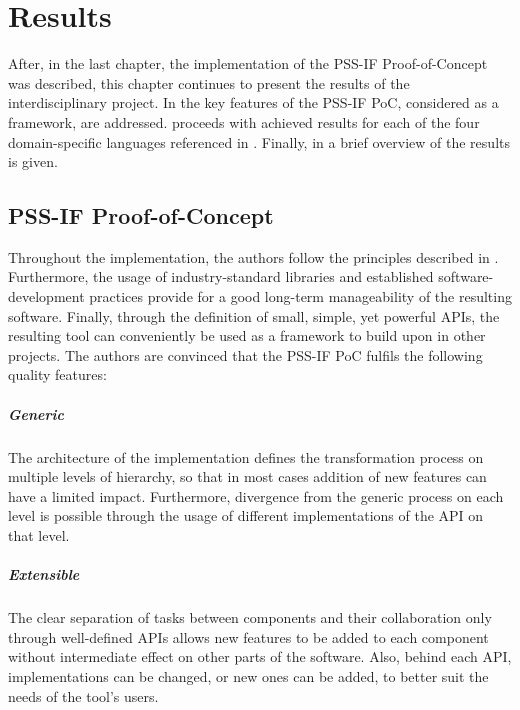 \chapter{Results}
\label{chap:results}

After, in the last chapter, the implementation of the PSS-IF Proof-of-Concept was described, this chapter continues to present the results of the interdisciplinary project. In  the key features of the PSS-IF PoC, considered as a framework, are addressed.  proceeds with achieved results for each of the four domain-specific languages referenced in . Finally, in  a brief overview of the results is given.

\section{PSS-IF Proof-of-Concept}
\label{sec:results:framework}

Throughout the implementation, the authors follow the principles described in . Furthermore, the usage of industry-standard libraries and established software-development practices provide for a good long-term manageability of the resulting software. Finally, through the definition of small, simple, yet powerful APIs, the resulting tool can conveniently be used as a framework to build upon in other projects. The authors are convinced that the PSS-IF PoC fulfils the following quality features:

\paragraph{Generic} The architecture of the implementation defines the transformation process on multiple levels of hierarchy, so that in most cases addition of new features can have a limited impact. Furthermore, divergence from the generic process on each level is possible through the usage of different implementations of the API on that level.

\paragraph{Extensible} The clear separation of tasks between components and their collaboration only through well-defined APIs allows new features to be added to each component without intermediate effect on other parts of the software. Also, behind each API, implementations can be changed, or new ones can be added, to better suit the needs of the tool's users.

